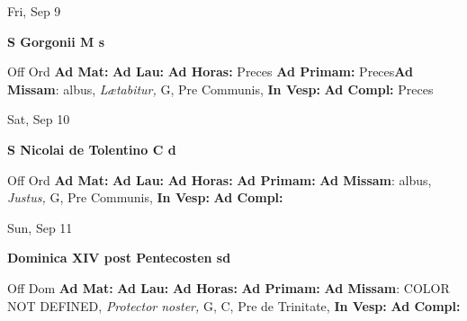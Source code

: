 \documentclass[10pt]{book}
\begin{document}
\begin{center}
\begin{minipage}{3.5in}
\vspace{2em}
\begin{center}Fri, Sep 9
\end{center}
\textbf{ \large S Gorgonii M
\textnormal{\normalsize s}}

\begin{justify}Off Ord
\textbf{Ad Mat: }
\textbf{Ad Lau: }
\textbf{Ad Horas: }Preces
\textbf{Ad Primam: }Preces\textbf{Ad Missam}: albus, \textit{Lætabitur,} G, Pre Communis, 
\textbf{In Vesp: }
\textbf{Ad Compl: }Preces
\end{justify}
\end{minipage}
\end{center}

\begin{center}
\begin{minipage}{3.5in}
\vspace{2em}
\begin{center}Sat, Sep 10
\end{center}
\textbf{ \large S Nicolai de Tolentino C
\textnormal{\normalsize d}}

\begin{justify}Off Ord
\textbf{Ad Mat: }
\textbf{Ad Lau: }
\textbf{Ad Horas: }
\textbf{Ad Primam: }\textbf{Ad Missam}: albus, \textit{Justus,} G, Pre Communis, 
\textbf{In Vesp: }
\textbf{Ad Compl: }
\end{justify}
\end{minipage}
\end{center}

\begin{center}
\begin{minipage}{3.5in}
\vspace{2em}
\begin{center}Sun, Sep 11
\end{center}
\textbf{ \large Dominica XIV post Pentecosten
\textnormal{\normalsize sd}}

\begin{justify}Off Dom
\textbf{Ad Mat: }
\textbf{Ad Lau: }
\textbf{Ad Horas: }
\textbf{Ad Primam: }\textbf{Ad Missam}: COLOR NOT DEFINED, \textit{Protector noster,} G, C, Pre de Trinitate, 
\textbf{In Vesp: }
\textbf{Ad Compl: }
\end{justify}
\end{minipage}
\end{center}
\end{document}
